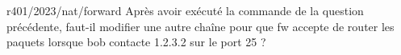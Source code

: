 \begin{question}{r401/2023/nat/forward}
  Après avoir exécuté la commande de la question précédente, faut-il
  modifier une autre chaîne pour que fw accepte de router les paquets
  lorsque bob contacte 1.2.3.2 sur le port 25 ?
  \begin{reponseshoriz}
    
    
    
    
  \end{reponseshoriz}
\end{question}
